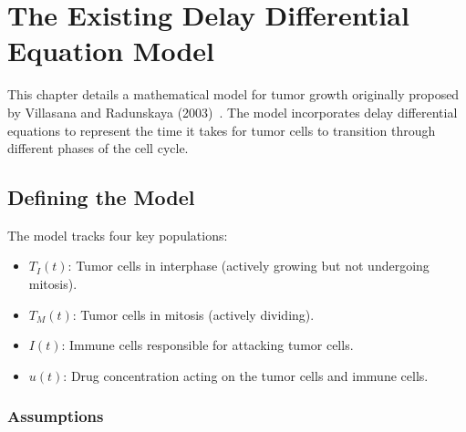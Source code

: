 \chapter{The Existing Delay Differential Equation Model}

This chapter details a mathematical model for tumor growth originally proposed by Villasana and Radunskaya (2003)~\cite{villasana_delay_2003}. The model incorporates delay differential equations to represent the time it takes for tumor cells to transition through different phases of the cell cycle.

\section{Defining the Model}

The model tracks four key populations:

\begin{itemize}
    \item $T_I(t)$: Tumor cells in interphase (actively growing but not undergoing mitosis).
    \item $T_M(t)$: Tumor cells in mitosis (actively dividing).
    \item $I(t)$: Immune cells responsible for attacking tumor cells.
    \item $u(t)$: Drug concentration acting on the tumor cells and immune cells.
\end{itemize}

\subsection{Assumptions}



